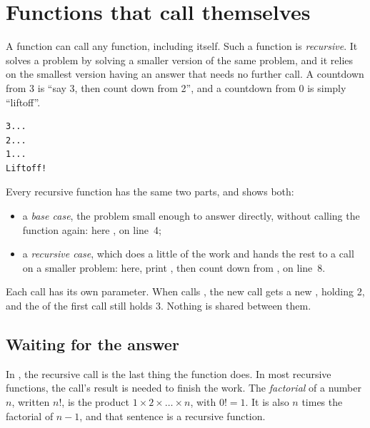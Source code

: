 \vfill\pagebreak
\section{Functions that call themselves}
\label{sec:functions:recursion}

A function can call any function, including itself. Such a function is
\textit{recursive}. It solves a problem by solving a smaller version of the same
problem, and it relies on the smallest version having an answer that needs no
further call. A countdown from 3 is ``say 3, then count down from 2'', and a
countdown from 0 is simply ``liftoff''.


\vspace{-10pt}%
\begin{lstlisting}[style=bashVerb]
3...
2...
1...
Liftoff!
\end{lstlisting}

Every recursive function has the same two parts, and  shows
both:

\begin{itemize}
\item a \textit{base case}, the problem small enough to answer directly, without
  calling the function again: here , on line~4;
\item a \textit{recursive case}, which does a little of the work and hands the
  rest to a call on a smaller problem: here, print , then count down from
  , on line~8.
\end{itemize}

Each call has its own parameter. When  calls
, the new call gets a new , holding 2, and the
 of the first call still holds 3. Nothing is shared between them.

\subsection{Waiting for the answer}

In , the recursive call is the last thing the function does. In
most recursive functions, the call's result is needed to finish the work. The
\textit{factorial} of a number $n$, written $n!$, is the product
$1 \times 2 \times \dots \times n$, with $0! = 1$. It is also $n$ times the
factorial of $n - 1$, and that sentence is a recursive function.

